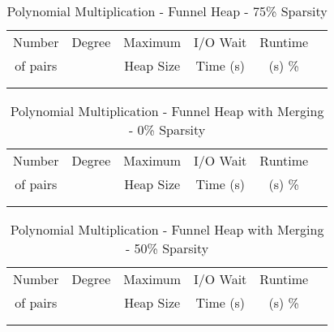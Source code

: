 \documentclass[11pt, one-sided]{amsart}
\begin{document}
\begin{table}[htbp]
   \centering
      \caption{Polynomial Multiplication - Funnel Heap - 75\% Sparsity}
   \begin{tabular}{|c|c|c|c|c|c|}
   	\hline
		 Number   & 	Degree	& Maximum & I/O Wait		& Runtime 	 \\ 
		 of pairs 	&			& Heap Size	& Time (s)		&	(s)		 		\%				\\ \hline
		 		&			&			&			&						\\
		 		&			&			&			&						\\
   \end{tabular}
   \label{tab:booktabs}
\end{table}



\newpage


\begin{table}[htbp]
   \centering
      \caption{Polynomial Multiplication - Funnel Heap with Merging - 0\% Sparsity}
   \begin{tabular}{|c|c|c|c|c|c|}
   	\hline
		 Number   & 	Degree	& Maximum & I/O Wait		&  Runtime  \\ 
		 of pairs 	&			& Heap Size	& Time (s)		&	(s)	 		\%				\\ \hline
		 		&			&			&			&						\\
				&			&			&			&						\\
   \end{tabular}
   \label{tab:booktabs}
\end{table}

\begin{table}[htbp]
   \centering
      \caption{Polynomial Multiplication - Funnel Heap with Merging - 50\% Sparsity}
   \begin{tabular}{|c|c|c|c|c|c|}
   	\hline
		 Number   & 	Degree	& Maximum & 	I/O Wait	&  Runtime 	 \\ 
		 of pairs 	&			& Heap Size	& 	Time (s)		&	(s)	 		\%				\\ \hline
		 		&			&			&			&						\\
		 		&			&			&			&						\\
   \end{tabular}
   \label{tab:booktabs}
\end{table}
\end{document}
